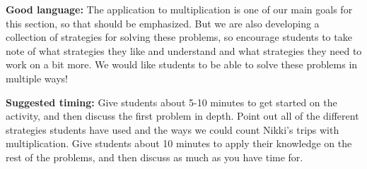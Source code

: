 \documentclass[nooutcomes,noauthor, handout]{ximera}
\begin{document}
\begin{instructorNotes}
{\bf Good language:} The application to multiplication is one of our main goals for this section, so that should be emphasized. But we are also developing a collection of strategies for solving these problems, so encourage students to take note of what strategies they like and understand and what strategies they need to work on a bit more. We would like students to be able to solve these problems in multiple ways!


{\bf Suggested timing:} Give students about 5-10 minutes to get started on the activity, and then discuss the first problem in depth. Point out all of the different strategies students have used and the ways we could count Nikki's trips with multiplication. Give students about 10 minutes to apply their knowledge on the rest of the problems, and then discuss as much as you have time for.

\end{instructorNotes}
\end{document}
